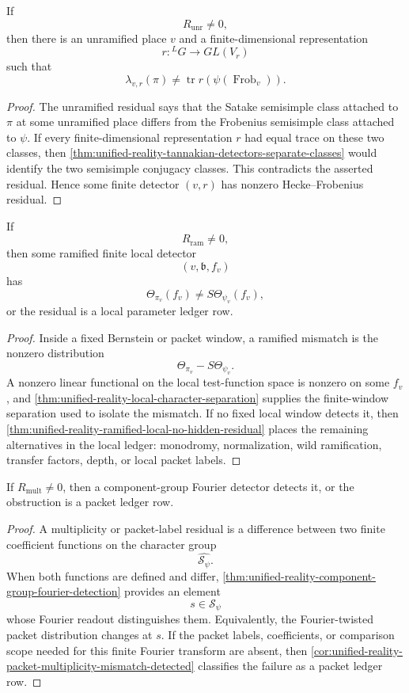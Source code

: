 \begin{theorem}
\label{thm:unified-reality-unramified-residual-finite-detected}
If
$$
R_{\mathrm{unr}}\ne0,
$$
then there is an unramified place $v$ and a finite-dimensional
representation
$$
r:{}^LG\to GL(V_r)
$$
such that
$$
\lambda_{v,r}(\pi)
\ne
\operatorname{tr}r(\psi(\operatorname{Frob}_v)).
$$
\end{theorem}
\begin{proof}
The unramified residual says that the Satake semisimple class attached
to $\pi$ at some unramified place differs from the Frobenius
semisimple class attached to $\psi$. If every finite-dimensional
representation $r$ had equal trace on these two classes, then
\autoref{thm:unified-reality-tannakian-detectors-separate-classes}
would identify the two semisimple conjugacy classes. This contradicts
the asserted residual. Hence some finite detector $(v,r)$ has nonzero
Hecke--Frobenius residual.
\end{proof}

\begin{theorem}
\label{thm:unified-reality-ramified-residual-finite-detected-or-ledgered}
If
$$
R_{\mathrm{ram}}\ne0,
$$
then some ramified finite local detector
$$
(v,\mathfrak b,f_v)
$$
has
$$
\Theta_{\pi_v}(f_v)\ne S\Theta_{\psi_v}(f_v),
$$
or the residual is a local parameter ledger row.
\end{theorem}
\begin{proof}
Inside a fixed Bernstein or packet window, a ramified mismatch is the
nonzero distribution
$$
\Theta_{\pi_v}-S\Theta_{\psi_v}.
$$
A nonzero linear functional on the local test-function space is
nonzero on some $f_v$, and
\autoref{thm:unified-reality-local-character-separation} supplies the
finite-window separation used to isolate the mismatch. If no fixed
local window detects it, then
\autoref{thm:unified-reality-ramified-local-no-hidden-residual} places
the remaining alternatives in the local ledger: monodromy,
normalization, wild ramification, transfer factors, depth, or local
packet labels.
\end{proof}

\begin{theorem}
\label{thm:unified-reality-component-residual-fourier-detected}
If $R_{\mathrm{mult}}\ne0$, then a component-group Fourier detector
detects it, or the obstruction is a packet ledger row.
\end{theorem}
\begin{proof}
A multiplicity or packet-label residual is a difference between two
finite coefficient functions on the character group
$$
\widehat{\mathcal S_\psi}.
$$
When both functions are defined and differ,
\autoref{thm:unified-reality-component-group-fourier-detection}
provides an element
$$
s\in\mathcal S_\psi
$$
whose Fourier readout distinguishes them. Equivalently, the
Fourier-twisted packet distribution changes at $s$. If the packet
labels, coefficients, or comparison scope needed for this finite
Fourier transform are absent, then
\autoref{cor:unified-reality-packet-multiplicity-mismatch-detected}
classifies the failure as a packet ledger row.
\end{proof}

